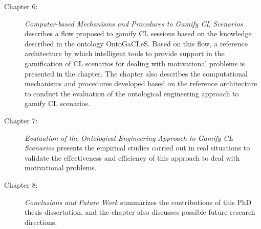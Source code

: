 \begin{description}
\item[Chapter 6:]
\emph{Computer-based Mechanisms and Procedures to Gamify CL Scenarios} describes a flow proposed to gamify CL sessions based on the knowledge described in the ontology OntoGaCLeS.
Based on this flow, a reference architecture by which intelligent tools to provide support in the gamification of CL scenarios for dealing with motivational problems is presented in the chapter.
The chapter also describes the computational mechanisms and procedures developed based on the reference architecture to conduct the evaluation of the ontological engineering approach to gamify CL scenarios.

\item[Chapter 7:]
\emph{Evaluation of the Ontological Engineering Approach to Gamify CL Scenarios} presents the empirical studies carried out in real situations to validate the effectiveness and efficiency of this approach to deal with motivational problems.

\item[Chapter 8:]
\emph{Conclusions and Future Work} summarizes the contributions of this PhD thesis dissertation, and the chapter also discusses possible future research directions. 

\end{description}
